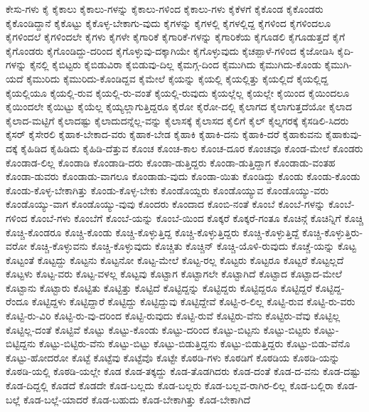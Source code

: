 {ಕೇಸು-ಗಳು
ಕೈ
ಕೈಕಾಲು
ಕೈಕಾಲು-ಗಳನ್ನು
ಕೈಕಾಲು-ಗಳಿಂದ
ಕೈಕಾಲು-ಗಳು
ಕೈಕೆಳಗೆ
ಕೈಕೊಂಡ
ಕೈಕೊಂಡರು
ಕೈಕೊಂಡಿದ್ದಾನೆ
ಕೈಕೊಟ್ಟು
ಕೈಕೊಳ್ಳ-ಬೇಕಾಗು-ವುದು
ಕೈಗಳನ್ನು
ಕೈಗಳಲ್ಲಿ
ಕೈಗಳಲ್ಲಿದ್ದ
ಕೈಗಳಿಂದ
ಕೈಗಳಿಂದಲೂ
ಕೈಗಳಿಂದಲೆ
ಕೈಗಳಿಂದಲೇ
ಕೈಗಳು
ಕೈಗಳೇ
ಕೈಗಾರಿಕೆ
ಕೈಗಾರಿಕೆ-ಗಳನ್ನು
ಕೈಗಾರಿಕೆಯ
ಕೈಗೂಡಲಿ
ಕೈಗೂಡುತ್ತದೆ
ಕೈಗೆ
ಕೈಗೊಂಡರು
ಕೈಗೊಂಡಿದ್ದು-ದರಿಂದ
ಕೈಗೊಳ್ಳುವು-ದಕ್ಕಾಗಿಯೇ
ಕೈಗೊಳ್ಳುವುದು
ಕೈಚಪ್ಪಾಳೆ-ಗಳಿಂದ
ಕೈಜೋಡಿಸಿ
ಕೈದಿ-ಗಳನ್ನು
ಕೈನಲ್ಲಿ
ಕೈಬಿಟ್ಟರು
ಕೈಬಿಡುವಿರಾ
ಕೈಬಿಡುವು-ದಿಲ್ಲ
ಕೈಮಗ್ಗ-ದಿಂದ
ಕೈಮುಗಿದು
ಕೈಮುಗಿದು-ಕೊಂಡು
ಕೈಮುಗಿ-ಯದೆ
ಕೈಮುರಿದು
ಕೈಮುರಿದು-ಕೊಂಡಿದ್ದವ
ಕೈಮೇಲೆ
ಕೈಯನ್ನು
ಕೈಯಲ್ಲಿ
ಕೈಯಲ್ಲಿತ್ತು
ಕೈಯಲ್ಲಿದೆ
ಕೈಯಲ್ಲಿದ್ದ
ಕೈಯಲ್ಲಿಯೂ
ಕೈಯಲ್ಲಿ-ರುವ
ಕೈಯಲ್ಲಿ-ರು-ವಂತೆ
ಕೈಯಲ್ಲಿ-ರುವುದು
ಕೈಯಲ್ಲೆಲ್ಲ
ಕೈಯಲ್ಲೇ
ಕೈಯಿಂದ
ಕೈಯಿಂದಲೂ
ಕೈಯಿಂದಲೇ
ಕೈಯಿಟ್ಟು
ಕೈಯೆಲ್ಲ
ಕೈಯ್ಯಲ್ಲಾಗುತ್ತಿದ್ದರೂ
ಕೈರೋ
ಕೈರೋ-ದಲ್ಲಿ
ಕೈಲಾಗದ
ಕೈಲಾಗುತ್ತದೆಯೋ
ಕೈಲಾದ
ಕೈಲಾದ-ಮಟ್ಟಿಗೆ
ಕೈಲಾದಷ್ಟು
ಕೈಲಾದುದನ್ನೆಲ್ಲ-ವನ್ನು
ಕೈಲಾಸಕ್ಕೆ
ಕೈಲಾಸದ
ಕೈಲಿಗೆ
ಕೈಲ್
ಕೈಲ್ನಗರಕ್ಕೆ
ಕೈಸಡಿಲಿ-ಸಿದರು
ಕೈಸರ್
ಕೈಸೇರಲಿ
ಕೈಹಾಕ-ಬೇಕಾದ-ವರು
ಕೈಹಾಕ-ಬೇಡ
ಕೈಹಾಕಿ
ಕೈಹಾಕಿ-ದನು
ಕೈಹಾಕಿ-ದರೆ
ಕೈಹಾಕುವನು
ಕೈಹಾಕುವು-ದಕ್ಕೆ
ಕೈಹಿಡಿದ
ಕೈಹಿಡಿದು
ಕೈಹಿಡಿ-ದೆತ್ತುವ
ಕೊಂಚ
ಕೊಂಚ-ಕಾಲ
ಕೊಂಚ-ದೂರ
ಕೊಂಚವೂ
ಕೊಂಡ-ಮೇಲೆ
ಕೊಂಡರು
ಕೊಂಡಾಡ-ಲಿಲ್ಲ
ಕೊಂಡಾಡಿ
ಕೊಂಡಾಡಿ-ದರು
ಕೊಂಡಾ-ಡುತ್ತಿದ್ದರು
ಕೊಂಡಾ-ಡುತ್ತಿದ್ದಾಗ
ಕೊಂಡಾಡು-ವಂತಹ
ಕೊಂಡಾ-ಡುವರು
ಕೊಂಡಾಡು-ವಾಗಲೂ
ಕೊಂಡಾಡು-ವುದು
ಕೊಂಡಾ-ಯಿತು
ಕೊಂಡಿದ್ದು
ಕೊಂಡು
ಕೊಂಡು-ಕೊಂಡು
ಕೊಂಡು-ಕೊಳ್ಳ-ಬೇಕಾಗಿತ್ತು
ಕೊಂಡು-ಕೊಳ್ಳ-ಬೇಕು
ಕೊಂಡೊಯ್ದರು
ಕೊಂಡೊಯ್ಯುವ
ಕೊಂಡೊಯ್ಯು-ವರು
ಕೊಂಡೊಯ್ಯು-ವಾಗ
ಕೊಂಡೊಯ್ಯು-ವುವು
ಕೊಂದರು
ಕೊಂದಾದ
ಕೊಂಬಿ-ನಂತೆ
ಕೊಂಬೆ
ಕೊಂಬೆ-ಗಳನ್ನು
ಕೊಂಬೆ-ಗಳಿಂದ
ಕೊಂಬೆ-ಗಳು
ಕೊಂಬೆಗೆ
ಕೊಂಬೆ-ಯನ್ನು
ಕೊಂಬೆ-ಯಿಂದ
ಕೊಕ್ಕರೆ
ಕೊಕ್ಕರೆ-ಗಂತೂ
ಕೊಚಿನ್ಗೆ
ಕೊಚಿನ್ನಿಗೆ
ಕೊಚ್ಚಿ
ಕೊಚ್ಚಿ-ಕೊಂಡರೂ
ಕೊಚ್ಚಿ-ಕೊಂಡು
ಕೊಚ್ಚಿ-ಕೊಳ್ಳುತ್ತಿದ್ದ
ಕೊಚ್ಚಿ-ಕೊಳ್ಳುತ್ತಿದ್ದರು
ಕೊಚ್ಚಿ-ಕೊಳ್ಳುತ್ತಿದ್ದೆ
ಕೊಚ್ಚಿ-ಕೊಳ್ಳುತ್ತಿರು-ವರೋ
ಕೊಚ್ಚಿ-ಕೊಳ್ಳುವನು
ಕೊಚ್ಚಿ-ಕೊಳ್ಳುವುದು
ಕೊಚ್ಚಿತು
ಕೊಚ್ಚಿನ್
ಕೊಚ್ಚಿ-ಯೊಳಿ-ರುವುದು
ಕೊಚ್ಚೆ-ಯನ್ನು
ಕೊಟ್ಟ
ಕೊಟ್ಟಂತೆ
ಕೊಟ್ಟದ್ದು
ಕೊಟ್ಟನು
ಕೊಟ್ಟನೋ
ಕೊಟ್ಟ-ಮೇಲೆ
ಕೊಟ್ಟ-ರಲ್ಲ
ಕೊಟ್ಟರು
ಕೊಟ್ಟರೂ
ಕೊಟ್ಟರೆ
ಕೊಟ್ಟಲ್ಲದೆ
ಕೊಟ್ಟಳು
ಕೊಟ್ಟ-ವರು
ಕೊಟ್ಟ-ವಳಲ್ಲ
ಕೊಟ್ಟವು
ಕೊಟ್ಟಾಗ
ಕೊಟ್ಟಾಗಲೇ
ಕೊಟ್ಟಾಗಿದೆ
ಕೊಟ್ಟಾದ
ಕೊಟ್ಟಾದ-ಮೇಲೆ
ಕೊಟ್ಟಾನು
ಕೊಟ್ಟಾರು
ಕೊಟ್ಟಿತು
ಕೊಟ್ಟಿತ್ತು
ಕೊಟ್ಟಿದೆ
ಕೊಟ್ಟಿದ್ದನ್ನು
ಕೊಟ್ಟಿದ್ದರು
ಕೊಟ್ಟಿದ್ದರೂ
ಕೊಟ್ಟಿದ್ದರೆ
ಕೊಟ್ಟಿದ್ದ-ರೆಂದೂ
ಕೊಟ್ಟಿದ್ದಳು
ಕೊಟ್ಟಿದ್ದಾರೆ
ಕೊಟ್ಟಿದ್ದು
ಕೊಟ್ಟಿದ್ದುವು
ಕೊಟ್ಟಿದ್ದೇವೆ
ಕೊಟ್ಟಿ-ರ-ಲಿಲ್ಲ
ಕೊಟ್ಟಿ-ರುವ
ಕೊಟ್ಟಿ-ರು-ವರು
ಕೊಟ್ಟಿ-ರು-ವಿರಿ
ಕೊಟ್ಟಿ-ರು-ವು-ದರಿಂದ
ಕೊಟ್ಟಿ-ರುವುದು
ಕೊಟ್ಟಿ-ರುವೆ
ಕೊಟ್ಟಿರು-ವೆನು
ಕೊಟ್ಟಿರು-ವೆವು
ಕೊಟ್ಟಿಲ್ಲ
ಕೊಟ್ಟಿಲ್ಲ-ದಂತೆ
ಕೊಟ್ಟಿವೆ
ಕೊಟ್ಟು
ಕೊಟ್ಟು-ಕೊಂಡು
ಕೊಟ್ಟು-ದರಿಂದ
ಕೊಟ್ಟು-ಬಿಟ್ಟನು
ಕೊಟ್ಟು-ಬಿಟ್ಟರು
ಕೊಟ್ಟು-ಬಿಟ್ಟಿದ್ದನು
ಕೊಟ್ಟು-ಬಿಟ್ಟಿರು-ವೆನು
ಕೊಟ್ಟು-ಬಿಟ್ಟು
ಕೊಟ್ಟು-ಬಿಡುತ್ತಿದ್ದನು
ಕೊಟ್ಟು-ಬಿಡುತ್ತಿದ್ದರು
ಕೊಟ್ಟು-ಬಿಡು-ವೆನೊ
ಕೊಟ್ಟು-ಹೋದರೋ
ಕೊಟ್ಟೆ
ಕೊಟ್ಟೆವು
ಕೊಟ್ಟೆವೊ
ಕೊಟ್ಟೇ
ಕೊಠಡಿ-ಗಳು
ಕೊಠಡಿಗೆ
ಕೊಠಡಿಯ
ಕೊಠಡಿ-ಯನ್ನು
ಕೊಠಡಿ-ಯಲ್ಲಿ
ಕೊಠಡಿ-ಯಲ್ಲೇ
ಕೊಡ
ಕೊಡ-ತಕ್ಕದ್ದು
ಕೊಡ-ತೊಡಗಿದರು
ಕೊಡ-ದಂತೆ
ಕೊಡ-ದ-ವನು
ಕೊಡ-ದಷ್ಟು
ಕೊಡ-ದಿದ್ದಲ್ಲಿ
ಕೊಡದೆ
ಕೊಡದೇ
ಕೊಡ-ಬಲ್ಲದು
ಕೊಡ-ಬಲ್ಲರು
ಕೊಡ-ಬಲ್ಲವ-ರಾಗಿರ-ಲಿಲ್ಲ
ಕೊಡ-ಬಲ್ಲಿರಾ
ಕೊಡ-ಬಲ್ಲೆ
ಕೊಡ-ಬಲ್ಲೆ-ಯಾದರೆ
ಕೊಡ-ಬಹುದು
ಕೊಡ-ಬೇಕಾಗಿತ್ತು
ಕೊಡ-ಬೇಕಾಗಿದೆ
}
